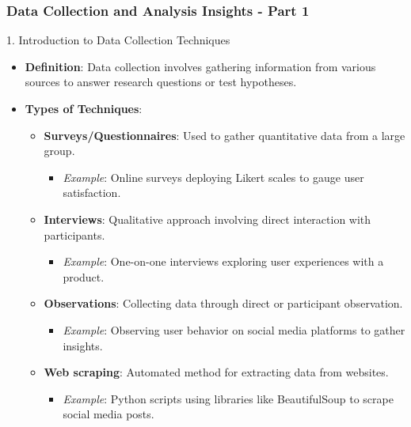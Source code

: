 \documentclass{beamer}
\begin{document}
\begin{frame}[fragile]
    \frametitle{Data Collection and Analysis Insights - Part 1}
    \begin{block}{1. Introduction to Data Collection Techniques}
        \begin{itemize}
            \item \textbf{Definition}: Data collection involves gathering information from various sources to answer research questions or test hypotheses.
            \item \textbf{Types of Techniques}:
            \begin{itemize}
                \item \textbf{Surveys/Questionnaires}: Used to gather quantitative data from a large group.
                \begin{itemize}
                    \item \textit{Example}: Online surveys deploying Likert scales to gauge user satisfaction.
                \end{itemize}
                \item \textbf{Interviews}: Qualitative approach involving direct interaction with participants.
                \begin{itemize}
                    \item \textit{Example}: One-on-one interviews exploring user experiences with a product.
                \end{itemize}
                \item \textbf{Observations}: Collecting data through direct or participant observation.
                \begin{itemize}
                    \item \textit{Example}: Observing user behavior on social media platforms to gather insights.
                \end{itemize}
                \item \textbf{Web scraping}: Automated method for extracting data from websites.
                \begin{itemize}
                    \item \textit{Example}: Python scripts using libraries like BeautifulSoup to scrape social media posts.
                \end{itemize}
            \end{itemize}
        \end{itemize}
    \end{block}
\end{frame}
\end{document}

